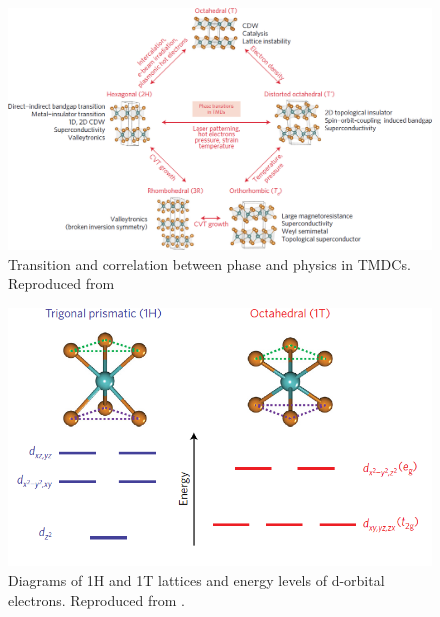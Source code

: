 \begin{figure}[!h]
	\begin{center}
		\includegraphics[scale=0.3]{1T'/TMDCPhases.png}
		\caption{Transition and correlation between phase and physics in TMDCs. Reproduced from \cite{Yang2017}}
		\label{fig:1T'TMDCPhases}
	\end{center}
\end{figure}

\begin{figure}[!h]
	\begin{center}
		\includegraphics[scale=0.5]{1T'/EnergyDiagram.png}
		\caption{Diagrams of 1H and 1T lattices and energy levels of d-orbital electrons. Reproduced from \cite{Yang2017}.}
		\label{fig:1T'EnergyDiagram}
	\end{center}
\end{figure}

